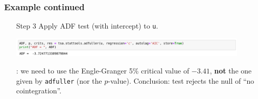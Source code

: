 \begin{frame}\frametitle{Example continued}
\begin{itemize}
\item[Step 3] Apply ADF test (with intercept) to \texttt{u}.
\begin{center}
\includegraphics[width=0.9\textwidth]{englegranger}
\end{center}
: we need to use the Engle-Granger 5\% critical value of $-3.41$, \textbf{not} the one given by \texttt{adfuller} (nor the $p$-value). Conclusion: test rejects the null of ``no cointegration''.
\end{itemize}
\end{frame}
